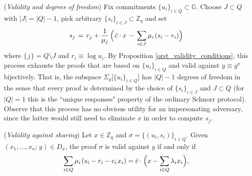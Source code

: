 \documentclass{iacrtrans}
\begin{document}
\begin{rem}\label{orst_validity_degrees_of_freedom}
(\textit{Validity and degrees of freedom})
Fix commitments $\{u_i\}_{i \in Q} \subset \mathbb{G}$.
Choose $J \subset Q$ with $|J| = |Q| - 1$,
pick arbitrary $\{s_i\}_{i \in J} \subset \mathbb{Z}_q$
and set
\vspace{5pt}
\begin{equation*}\label{orst_validity_degrees_of_freedom_formula}
s_j
	\hspace{1.5pt}
	=
	\hspace{1.5pt}
	r_j + \frac{1}{\mu_j}
	\hspace{1.5pt}
	\Big(
		\hspace{1.0pt}
		\bar{c}\cdot x
		\hspace{1.5pt}
		-
		\hspace{1.5pt}
		\sum_{i \in J}
			\mu_i
			\hspace{1pt}
			(s_i - r_i)
	\Big)
\vspace{5pt}
\end{equation*}
where $\{\hspace{1pt}j\hspace{1pt}\} = Q \setminus J$
and $r_i \equiv \log u_i$.
By Proposition \ref{orst_validity_conditions},
this process exhausts the proofs
that are based on $\{u_i\}_{i \in Q}$ and valid against
$y \equiv g ^ x$
bijectively.
That is, the subspace
$\Sigma_y \big[\{u_i\}_{i \in Q}\big]$
has $|Q| - 1$ degrees of freedom in the sense that
every proof is determined
by the choice of $\{s_i\}_{i \in J}$
and $J \subset Q$ (for $|Q| = 1$
this is the ``unique responses" property
of the ordinary Schnorr protocol).
Observe that this process has no obvious utility
for an impersonating adversary,
since the latter would still need
to eliminate $x$ in order to compute $s_j$.
\end{rem}

\begin{prop}\label{orst_validity_against_sharing_prop}
\textup{(\textit{Validity against sharing})}
Let $x \in \mathbb{Z}_q$ and
$\sigma = \{(u_i, s_i)\}_{i \in Q}$.
Given $(x_1, \dots, x_n;\hspace{1pt} y) \in D_x$,
the proof $\sigma$ is valid against $y$ if and only if
\vspace{5pt}
\begin{equation}\label{orst_validity_against_sharing}
\sum_{i \in Q} \mu_i\hspace{1pt} (s_i - r_i - c_i\hspace{1pt}x_i)
=
\bar{c} \cdot \Big(x - \sum_{i \in Q} \lambda_i x_i\Big),
\vspace{5pt}
\end{equation}
\end{prop}
\end{document}

